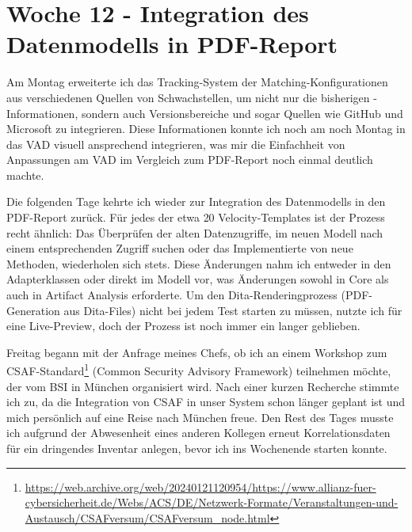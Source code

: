 \section{Woche 12 - Integration des Datenmodells in PDF-Report} \label{sec:bericht-wo-12}


\lweekdaymarginpar{\weekdayMondayLong}

Am Montag erweiterte ich das Tracking-System der Matching-Konfigurationen aus verschiedenen Quellen von Schwachstellen, um nicht nur die bisherigen -Informationen, sondern auch Versionsbereiche und sogar Quellen wie GitHub und Microsoft zu integrieren.
Diese Informationen konnte ich noch am noch Montag in das VAD visuell ansprechend integrieren, was mir die Einfachheit von Anpassungen am VAD im Vergleich zum PDF-Report noch einmal deutlich machte.

\sweekdaymarginpar{\weekdayTuesdayShort\ - \weekdayThursdayShort}

Die folgenden Tage kehrte ich wieder zur Integration des Datenmodells in den PDF-Report zurück.
Für jedes der etwa 20 Velocity-Templates ist der Prozess recht ähnlich:
Das Überprüfen der alten Datenzugriffe, im neuen Modell nach einem entsprechenden Zugriff suchen oder das Implementierte von neue Methoden, wiederholen sich stets.
Diese Änderungen nahm ich entweder in den Adapterklassen oder direkt im Modell vor, was Änderungen sowohl in Core als auch in Artifact Analysis erforderte.
Um den Dita-Renderingprozess (PDF-Generation aus Dita-Files) nicht bei jedem Test starten zu müssen, nutzte ich  für eine Live-Preview, doch der Prozess ist noch immer ein langer geblieben.

\sweekdaymarginpar{\weekdayFridayLong}

Freitag begann mit der Anfrage meines Chefs, ob ich an einem Workshop zum CSAF-Standard\footnote{\url{https://web.archive.org/web/20240121120954/https://www.allianz-fuer-cybersicherheit.de/Webs/ACS/DE/Netzwerk-Formate/Veranstaltungen-und-Austausch/CSAFversum/CSAFversum_node.html}} (Common Security Advisory Framework) teilnehmen möchte, der vom BSI in München organisiert wird.
Nach einer kurzen Recherche stimmte ich zu, da die Integration von CSAF in unser System schon länger geplant ist und mich persönlich auf eine Reise nach München freue.
Den Rest des Tages musste ich aufgrund der Abwesenheit eines anderen Kollegen erneut Korrelationsdaten für ein dringendes Inventar anlegen, bevor ich ins Wochenende starten konnte.
